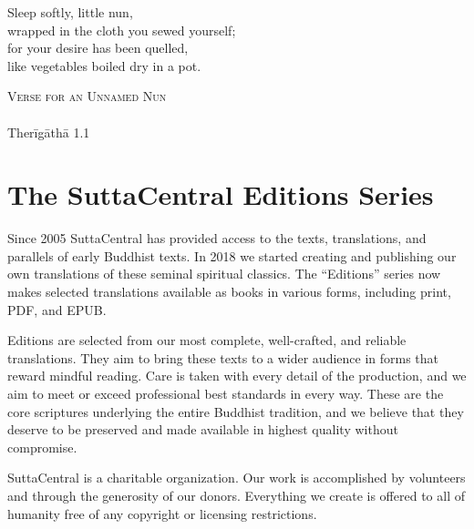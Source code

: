 \documentclass[12pt,openany]{book}%
\newcommand{\blankpage}{
\newpage
\thispagestyle{empty}
\mbox{}
\newpage
}
\newcommand*{\epigraphTranslatedTitle}[1]{\vspace*{.5em}\footnotesize\textsc{#1}\\}%
\newcommand*{\epigraphRootTitle}[1]{\footnotesize\textit{#1}\\}%
\newcommand*{\epigraphReference}[1]{\footnotesize{#1}}%
\begin{document}
\newpage

\setlength{\parindent}{1.5em}%
\newpage

\vspace*{\fill}

\begin{center}
\epigraph{Sleep softly, little nun,\\
wrapped in the cloth you sewed yourself;\\
for your desire has been quelled,\\
like vegetables boiled dry in a pot.}
{
\epigraphTranslatedTitle{Verse for an Unnamed Nun}
\epigraphRootTitle{}
\epigraphReference{\textsanskrit{Therīgāthā} 1.1}
}
\end{center}

\vspace*{2in}

\vspace*{\fill}

\blankpage%

\setlength{\parindent}{1em}
%
\tableofcontents
\newpage
\pagestyle{fancy}
%
\chapter*{The SuttaCentral Editions Series}

Since 2005 SuttaCentral has provided access to the texts, translations, and parallels of early Buddhist texts. In 2018 we started creating and publishing our own translations of these seminal spiritual classics. The “Editions” series now makes selected translations available as books in various forms, including print, PDF, and EPUB.

Editions are selected from our most complete, well-crafted, and reliable translations. They aim to bring these texts to a wider audience in forms that reward mindful reading. Care is taken with every detail of the production, and we aim to meet or exceed professional best standards in every way. These are the core scriptures underlying the entire Buddhist tradition, and we believe that they deserve to be preserved and made available in highest quality without compromise.

SuttaCentral is a charitable organization. Our work is accomplished by volunteers and through the generosity of our donors. Everything we create is offered to all of humanity free of any copyright or licensing restrictions. 
\end{document}
